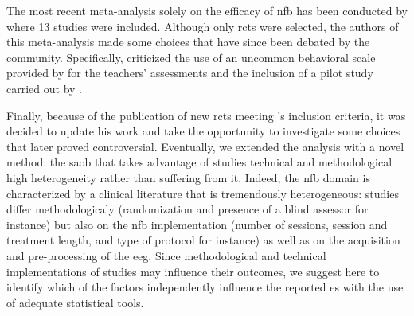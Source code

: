 The most recent meta-analysis solely on the efficacy of \gls{nfb} has been conducted by \citet{Cortese2016} where 13
studies were included. Although only \glspl{rct} were selected, the authors of this meta-analysis made some choices that
have since been debated by the community. Specifically, \citet{Micoulaud2016} criticized the use of an uncommon
behavioral scale provided by \citet{Steiner2014} for the teachers' assessments and the inclusion of a pilot study
carried out by \citet{Arnold2014}. 

Finally, because of the publication of new \glspl{rct} meeting \citeauthor{Cortese2016}'s inclusion criteria, it was
decided to update his work and take the opportunity to investigate some choices that later proved controversial.
Eventually, we extended the analysis with a novel method: the \gls{saob} that takes advantage of studies technical and
methodological high heterogeneity rather than suffering from it. Indeed, the \gls{nfb} domain is characterized by a
clinical literature that is tremendously heterogeneous: studies differ methodologicaly (randomization and presence of a
blind assessor for instance) but also on the \gls{nfb} implementation (number of sessions, session and treatment length,
and type of protocol for instance) as well as on the acquisition and pre-processing of the \gls{eeg}.  Since
methodological and technical implementations of studies may influence their outcomes, we suggest here to identify which
of the factors independently influence the reported \gls{es} with the use of adequate statistical tools.






